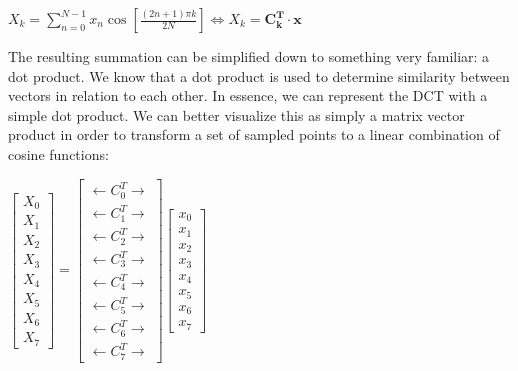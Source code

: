 \documentclass[11pt]{article}
\begin{document}
\begin{center}
    $
    X_k=\sum_{n = 0}^{N-1}x_n\cos \left[ \frac{(2n+1)\pi k}{2N} \right] \Longleftrightarrow X_k=\mathbf{C^T_k}\cdot \mathbf{x}
    $ \cite{website:jpeg}
\end{center}

The resulting summation can be simplified down to something very familiar: a dot product. We know that a dot product is used to determine similarity between vectors in relation to each other. In essence, we can represent the DCT with a simple dot product. We can better visualize this as simply a matrix vector product in order to transform a set of sampled points to a linear combination of cosine functions:

\begin{center}
    $
    \begin{bmatrix}
        X_0 \\
        X_1 \\
        X_2 \\
        X_3 \\
        X_4 \\
        X_5 \\
        X_6 \\
        X_7
    \end{bmatrix}
    =
    \begin{bmatrix}
        \longleftarrow C^T_0 \longrightarrow \\
        \longleftarrow C^T_1 \longrightarrow \\
        \longleftarrow C^T_2 \longrightarrow \\
        \longleftarrow C^T_3 \longrightarrow \\
        \longleftarrow C^T_4 \longrightarrow \\
        \longleftarrow C^T_5 \longrightarrow \\
        \longleftarrow C^T_6 \longrightarrow \\
        \longleftarrow C^T_7 \longrightarrow
    \end{bmatrix}
    \begin{bmatrix}
        x_0 \\
        x_1 \\
        x_2 \\
        x_3 \\
        x_4 \\
        x_5 \\
        x_6 \\
        x_7
    \end{bmatrix}
    $ \cite{website:jpeg}
\end{center}
\end{document}
